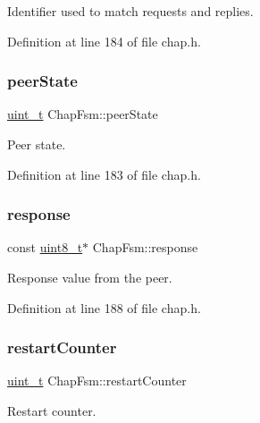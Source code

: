 Identifier used to match requests and replies. 



Definition at line 184 of file chap.\+h.

\mbox{\label{structChapFsm_a9eb96e32ed5cbdd3a3d41570da93a145}} 
\subsubsection{\texorpdfstring{peer\+State}{peerState}}
{\footnotesize\ttfamily \hyperlink{compiler__port_8h_a12a1e9b3ce141648783a82445d02b58d}{uint\+\_\+t} Chap\+Fsm\+::peer\+State}



Peer state. 



Definition at line 183 of file chap.\+h.

\mbox{\label{structChapFsm_af52570dc74a434f2ca9122a89a1ca241}} 
\subsubsection{\texorpdfstring{response}{response}}
{\footnotesize\ttfamily const \hyperlink{stdint_8h_aba7bc1797add20fe3efdf37ced1182c5}{uint8\+\_\+t}$\ast$ Chap\+Fsm\+::response}



Response value from the peer. 



Definition at line 188 of file chap.\+h.

\mbox{\label{structChapFsm_ac4757119b770f5462c78faf8567262ef}} 
\subsubsection{\texorpdfstring{restart\+Counter}{restartCounter}}
{\footnotesize\ttfamily \hyperlink{compiler__port_8h_a12a1e9b3ce141648783a82445d02b58d}{uint\+\_\+t} Chap\+Fsm\+::restart\+Counter}



Restart counter. 



